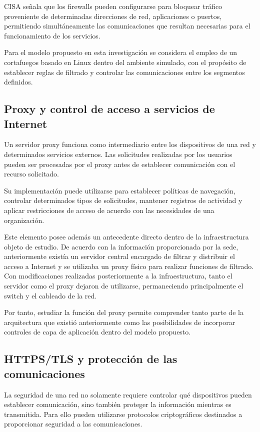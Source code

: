 CISA señala que los firewalls pueden configurarse para bloquear tráfico proveniente de determinadas direcciones de red, aplicaciones o puertos, permitiendo simultáneamente las comunicaciones que resultan necesarias para el funcionamiento de los servicios.

Para el modelo propuesto en esta investigación se considera el empleo de un cortafuegos basado en Linux dentro del ambiente simulado, con el propósito de establecer reglas de filtrado y controlar las comunicaciones entre los segmentos definidos.

\subsection{Proxy y control de acceso a servicios de Internet}

Un servidor proxy funciona como intermediario entre los dispositivos de una red y determinados servicios externos. Las solicitudes realizadas por los usuarios pueden ser procesadas por el proxy antes de establecer comunicación con el recurso solicitado.

Su implementación puede utilizarse para establecer políticas de navegación, controlar determinados tipos de solicitudes, mantener registros de actividad y aplicar restricciones de acceso de acuerdo con las necesidades de una organización.

Este elemento posee además un antecedente directo dentro de la infraestructura objeto de estudio. De acuerdo con la información proporcionada por la sede, anteriormente existía un servidor central encargado de filtrar y distribuir el acceso a Internet y se utilizaba un proxy físico para realizar funciones de filtrado. Con modificaciones realizadas posteriormente a la infraestructura, tanto el servidor como el proxy dejaron de utilizarse, permaneciendo principalmente el switch y el cableado de la red.

Por tanto, estudiar la función del proxy permite comprender tanto parte de la arquitectura que existió anteriormente como las posibilidades de incorporar controles de capa de aplicación dentro del modelo propuesto.



\subsection{HTTPS/TLS y protección de las comunicaciones}

La seguridad de una red no solamente requiere controlar qué dispositivos pueden establecer comunicación, sino también proteger la información mientras es transmitida. Para ello pueden utilizarse protocolos criptográficos destinados a proporcionar seguridad a las comunicaciones.

